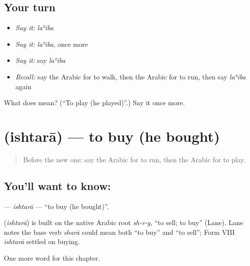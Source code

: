 \subsection*{Your turn}
\begin{itemize}
\raggedright
  \item \emph{Say it:} \emph{laʿiba}
  \item \emph{Say it:} \emph{laʿiba}, once more
  \item \emph{Say it:} say \emph{laʿiba}
  \item \emph{Recall:} say the Arabic for to walk, then the Arabic for to run, then say \emph{laʿiba} again
\end{itemize}

\begin{tcolorbox}[breakable,colback=teal!4,colframe=teal!35!black,title={Before you move on}]
What does  mean? (\textquotedblleft{}To play (he played)\textquotedblright{}.) Say it once more.
\end{tcolorbox}
\section[\texorpdfstring{\ar{اشترى} (ishtarā)}{اشترى (ishtarā)}]{ (ishtarā) — to buy (he bought)}

\label{lesson:AR-C58-ishtara}



\begin{quote}
Before the new one: say the Arabic for to run, then the Arabic for to play.
\end{quote}

\subsection*{You'll want to know: }
\textbf{} — \emph{ishtarā} — \textquotedblleft{}to buy (he bought)\textquotedblright{}.

\begin{cousinweb}
\textbf{} (\emph{ishtarā}) is built on the native Arabic root \emph{sh-r-y}, \textquotedblleft{}to sell; to buy\textquotedblright{} (Lane). Lane notes the base verb \emph{sharā} could mean both \textquotedblleft{}to buy\textquotedblright{} and \textquotedblleft{}to sell\textquotedblright{}; Form VIII \emph{ishtarā} settled on buying.
\end{cousinweb}

\begin{grammarlens}[title={What you've built}]
One more word for this chapter.
\end{grammarlens}

